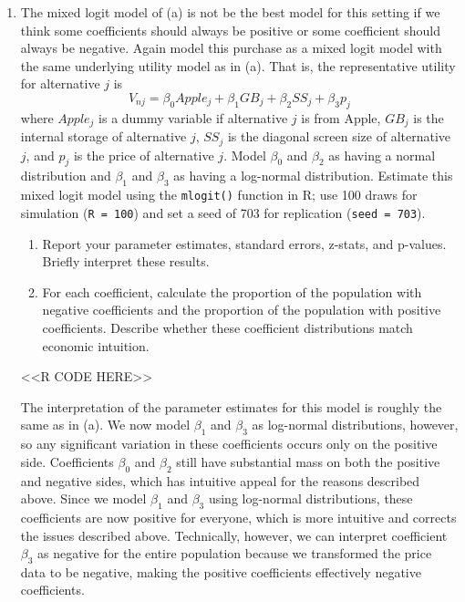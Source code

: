 \documentclass[11pt,letterpaper]{article}
\begin{document}
\begin{enumerate}[label=\alph*., leftmargin=*]
	\item The mixed logit model of (a) is not be the best model for this setting if we think some coefficients should always be positive or some coefficient should always be negative. Again model this purchase as a mixed logit model with the same underlying utility model as in (a). That is, the representative utility for alternative $j$ is
	$$V_{nj} = \beta_0 Apple_j + \beta_1 GB_j + \beta_2 SS_j + \beta_3 p_j$$
	where $Apple_j$ is a dummy variable if alternative $j$ is from Apple, $GB_j$ is the internal storage of alternative $j$, $SS_j$ is the diagonal screen size of alternative $j$, and $p_j$ is the price of alternative $j$. Model $\beta_0$ and $\beta_2$ as having a normal distribution and $\beta_1$ and $\beta_3$ as having a log-normal distribution. Estimate this mixed logit model using the \texttt{mlogit()} function in R; use 100 draws for simulation (\texttt{R = 100}) and set a seed of 703 for replication (\texttt{seed = 703}). 
	\begin{enumerate}[label=\roman*.]
		\item Report your parameter estimates, standard errors, z-stats, and p-values. Briefly interpret these results. 
		\item For each coefficient, calculate the proportion of the population with negative coefficients and the proportion of the population with positive coefficients. Describe whether these coefficient distributions match economic intuition.
	\end{enumerate}

	<<R CODE HERE>>

	The interpretation of the parameter estimates for this model is roughly the same as in (a). We now model $\beta_1$ and $\beta_3$ as log-normal distributions, however, so any significant variation in these coefficients occurs only on the positive side. Coefficients $\beta_0$ and $\beta_2$ still have substantial mass on both the positive and negative sides, which has intuitive appeal for the reasons described above. Since we model $\beta_1$ and $\beta_3$ using log-normal distributions, these coefficients are now positive for everyone, which is more intuitive and corrects the issues described above. Technically, however, we can interpret coefficient $\beta_3$ as negative for the entire population because we transformed the price data to be negative, making the positive coefficients effectively negative coefficients.


\end{enumerate}
\end{document}
